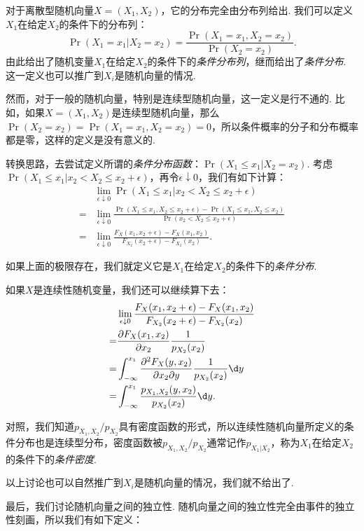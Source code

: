 对于离散型随机向量$X=(X_1,X_2)$，它的分布完全由分布列给出. 我们可以定义$X_1$在给定$X_2$的条件下的分布列：
\[\Pr(X_1=x_1|X_2=x_2)=\frac{\Pr(X_1=x_1,X_2=x_2)}{\Pr(X_2=x_2)}.\]
由此给出了随机变量$X_1$在给定$X_2$的条件下的\emph{条件分布列}，继而给出了\emph{条件分布}. 这一定义也可以推广到$X_i$是随机向量的情况. 

然而，对于一般的随机向量，特别是连续型随机向量，这一定义是行不通的. 比如，如果$X=(X_1,X_2)$是连续型随机向量，那么 $\Pr(X_2=x_2)=\Pr(X_1=x_1,X_2=x_2)=0$，所以条件概率的分子和分布概率都是零，这样的定义是没有意义的. 

转换思路，去尝试定义所谓的\emph{条件分布函数}：$\Pr(X_1\leq x_1|X_2=x_2)$. 考虑$\Pr(X_1\leq x_1|x_2< X_2\leq x_2+\epsilon)$，再令$\epsilon\downarrow 0$，我们有如下计算：
\begin{align*}
    &\lim_{\epsilon\downarrow 0}\Pr(X_1\leq x_1|x_2< X_2\leq x_2+\epsilon) \\
    =&\lim_{\epsilon\downarrow 0}\frac{\Pr(X_1\leq x_1,X_2\leq x_2+\epsilon)-\Pr(X_1\leq x_1,X_2\leq x_2)}{\Pr(x_2< X_2\leq x_2+\epsilon)}\\
    =&\lim_{\epsilon\downarrow 0}\frac{F_X(x_1,x_2+\epsilon)-F_X(x_1,x_2)}{F_{X_2}(x_2+\epsilon)-F_{X_2}(x_2)}.
\end{align*}

如果上面的极限存在，我们就定义它是$X_1$在给定$X_2$的条件下的\emph{条件分布}. 

如果$X$是连续性随机变量，我们还可以继续算下去：
\begin{align*}
    &\lim_{\epsilon\downarrow 0}\frac{F_X(x_1,x_2+\epsilon)-F_X(x_1,x_2)}{F_{X_2}(x_2+\epsilon)-F_{X_2}(x_2)}\\
    =&\frac{\partial F_X(x_1,x_2)}{\partial x_2}\frac{1}{p_{X_2}(x_2)}\\
    =&\int_{-\infty}^{x_1}\frac{\partial^2 F_X(y,x_2)}{\partial x_2\partial y}\frac{1}{p_{X_2}(x_2)}\d y\\
    =&\int_{-\infty}^{x_1}\frac{p_{X_1,X_2}(y,x_2)}{p_{X_2}(x_2)}\d y.
\end{align*}

对照，我们知道$p_{X_1,X_2}/p_{X_2}$具有密度函数的形式，所以连续性随机向量所定义的条件分布也是连续型分布，密度函数被$p_{X_1,X_2}/p_{X_2}$通常记作$p_{X_1|X_2}$，称为$X_1$在给定$X_2$的条件下的\emph{条件密度}. 

以上讨论也可以自然推广到$X_i$是随机向量的情况，我们就不给出了. 

最后，我们讨论随机向量之间的独立性. 随机向量之间的独立性完全由事件的独立性刻画，所以我们有如下定义：

